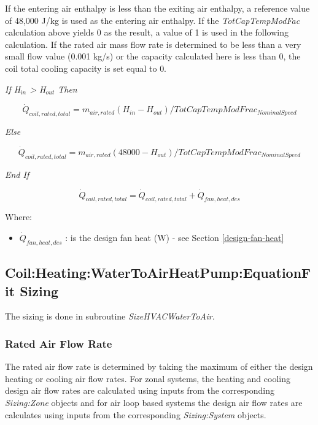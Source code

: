 If the entering air enthalpy is less than the exiting air enthalpy, a reference value of 48,000 J/kg is used as the entering air enthalpy. If the \emph{TotCapTempModFac} calculation above yields 0 as the result, a value of 1 is used in the following calculation. If the rated air mass flow rate is determined to be less than a very small flow value (0.001 kg/s) or the capacity calculated here is less than 0, the coil total cooling capacity is set equal to 0.

\emph{If H\(_{in}\) \textgreater{} H\(_{out}\) Then}

\begin{equation}
{\dot {Q}_{coil,rated,total}} = {m_{air,rated}}({H_{in}} - {H_{out}})/TotCapTempModFra{c_{NominalSpeed}}
\end{equation}

\emph{Else}

\begin{equation}
{\dot {Q}_{coil,rated,total}} = {m_{air,rated}}(48000 - {H_{out}})/TotCapTempModFra{c_{NominalSpeed}}
\end{equation}

\emph{End If}

\begin{equation}
{\dot{Q}_{coil,rated,total}} = {\dot{Q}_{coil,rated,total}} + \dot{Q}_{fan,heat,des}
\end{equation}

Where:

\begin{itemize}
\item
  \(\dot{Q}_{fan,heat,des}\) : is the design fan heat (W) - see Section \ref{design-fan-heat}
\end{itemize}

\subsection{Coil:Heating:WaterToAirHeatPump:EquationFit Sizing}\label{coilheatingwatertoairheatpumpequationfit-sizing}

The sizing is done in subroutine \emph{SizeHVACWaterToAir.}

\subsubsection{Rated Air Flow Rate}\label{rated-air-flow-rate-2}

The rated air flow rate is determined by taking the maximum of either the design heating or cooling air flow rates. For zonal systems, the heating and cooling design air flow rates are calculated using inputs from the corresponding \emph{Sizing:Zone} objects and for air loop based systems the design air flow rates are calculates using inputs from the corresponding \emph{Sizing:System} objects.

